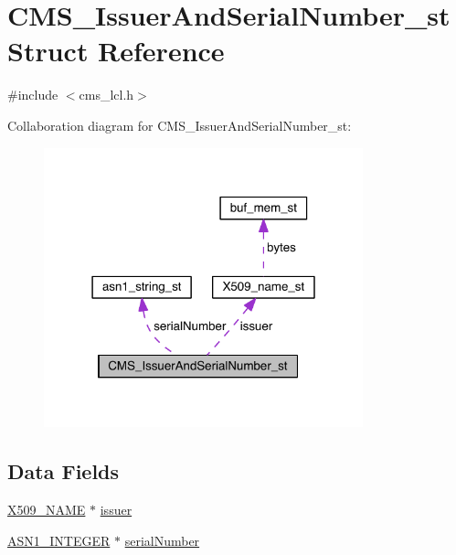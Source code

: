 \hypertarget{struct_c_m_s___issuer_and_serial_number__st}{}\section{C\+M\+S\+\_\+\+Issuer\+And\+Serial\+Number\+\_\+st Struct Reference}
\label{struct_c_m_s___issuer_and_serial_number__st}


{\ttfamily \#include $<$cms\+\_\+lcl.\+h$>$}



Collaboration diagram for C\+M\+S\+\_\+\+Issuer\+And\+Serial\+Number\+\_\+st\+:\nopagebreak
\begin{figure}[H]
\begin{center}
\leavevmode
\includegraphics[width=262pt]{struct_c_m_s___issuer_and_serial_number__st__coll__graph}
\end{center}
\end{figure}
\subsection*{Data Fields}
\begin{DoxyCompactItemize}
\item 
\hyperlink{crypto_2ossl__typ_8h_a5c5fc036757e87b9bd163d0221696533}{X509\+\_\+\+N\+A\+ME} $\ast$ \hyperlink{struct_c_m_s___issuer_and_serial_number__st_ac70a3f67417db441f9e4fb607e5390de}{issuer}
\item 
\hyperlink{crypto_2ossl__typ_8h_af4335399bf9774cb410a5e93de65998b}{A\+S\+N1\+\_\+\+I\+N\+T\+E\+G\+ER} $\ast$ \hyperlink{struct_c_m_s___issuer_and_serial_number__st_a574666772e12f5202cce61de15eaaa4e}{serial\+Number}
\end{DoxyCompactItemize}



